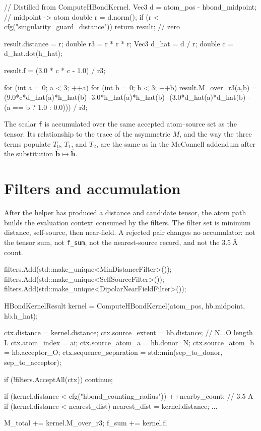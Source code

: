 \documentclass[11pt]{article}
\newcommand{\code}[1]{\texttt{#1}}
\begin{document}
\begin{codebox}
// Distilled from ComputeHBondKernel.
Vec3 d = atom_pos - hbond_midpoint;        // midpoint -> atom
double r = d.norm();
if (r < cfg("singularity_guard_distance")) return result;  // zero

result.distance = r;
double r3 = r * r * r;
Vec3 d_hat = d / r;
double c = d_hat.dot(h_hat);

result.f = (3.0 * c * c - 1.0) / r3;

for (int a = 0; a < 3; ++a)
    for (int b = 0; b < 3; ++b)
        result.M_over_r3(a,b) =
            (9.0*c*d_hat(a)*h_hat(b)
             -3.0*h_hat(a)*h_hat(b)
             -(3.0*d_hat(a)*d_hat(b) - (a == b ? 1.0 : 0.0))) / r3;
\end{codebox}

The scalar \code{f} is accumulated over the same accepted atom--source set as
the tensor. Its relationship to the trace of the asymmetric \(M\), and the way
the three terms populate \(T_0\), \(T_1\), and \(T_2\), are the same as in the
McConnell addendum after the substitution
\(\hat{\bm b}\mapsto\hat{\bm h}\).

\section{Filters and accumulation}

After the helper has produced a distance and candidate tensor, the atom path
builds the evaluation context consumed by the filters. The filter set is
minimum distance, self-source, then near-field. A rejected pair changes no
accumulator: not the tensor sum, not \code{f\_sum}, not the nearest-source
record, and not the \(\SI{3.5}{\angstrom}\) count.

\begin{codebox}
filters.Add(std::make_unique<MinDistanceFilter>());
filters.Add(std::make_unique<SelfSourceFilter>());
filters.Add(std::make_unique<DipolarNearFieldFilter>());

HBondKernelResult kernel =
    ComputeHBondKernel(atom_pos, hb.midpoint, hb.h_hat);

ctx.distance = kernel.distance;
ctx.source_extent = hb.distance;          // N...O length L
ctx.atom_index = ai;
ctx.source_atom_a = hb.donor_N;
ctx.source_atom_b = hb.acceptor_O;
ctx.sequence_separation = std::min(sep_to_donor, sep_to_acceptor);

if (!filters.AcceptAll(ctx)) continue;

if (kernel.distance < cfg("hbond_counting_radius")) ++nearby_count; // 3.5 A
if (kernel.distance < nearest_dist) { nearest_dist = kernel.distance; ... }

M_total += kernel.M_over_r3;
f_sum += kernel.f;
\end{codebox}
\end{document}
